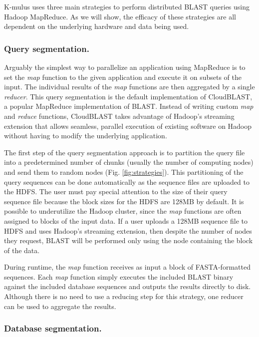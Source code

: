 \documentclass[12pt,\mydriver]{thesis}
\begin{document}
K-mulus uses three main strategies to perform distributed BLAST queries using Hadoop MapReduce.
As we will show, the efficacy of these strategies are all dependent on the underlying hardware and data being used.
\subsubsection{Query segmentation.}
Arguably the simplest way to parallelize an application using MapReduce is to set the \emph{map} function to the given application and execute it on subsets of the input.
The individual results of the \emph{map} functions are then aggregated by a single \emph{reducer}.
This query segmentation is the default implementation of CloudBLAST\cite{matsunaga2008cloudblast}, a popular MapReduce implementation of BLAST.
Instead of writing custom \emph{map} and \emph{reduce} functions, CloudBLAST takes advantage of Hadoop's streaming extension that allows seamless, parallel execution of existing software on Hadoop without having to modify the underlying application.

The first step of the query segmentation approach is to partition the query file into a predetermined number of chunks (usually the number of computing nodes) and send them to random nodes (Fig. \ref{fig:strategies}).
This partitioning of the query sequences can be done automatically as the sequence files are uploaded to the HDFS.
The user must pay special attention to the size of their query sequence file because the block sizes for the HDFS are 128MB by default.
It is possible to underutilize the Hadoop cluster, since the \emph{map} functions are often assigned to blocks of the input data.
If a user uploads a 128MB sequence file to HDFS and uses Hadoop's streaming extension, then despite the number of nodes they request, BLAST will be performed only using the node containing the block of the data.

During runtime, the \emph{map} function receives as input a block of FASTA-formatted sequences.
Each \emph{map} function simply executes the included BLAST binary against the included database sequences and outputs the results directly to disk.
Although there is no need to use a reducing step for this strategy, one reducer can be used to aggregate the results.

\subsubsection{Database segmentation.}
\end{document}
